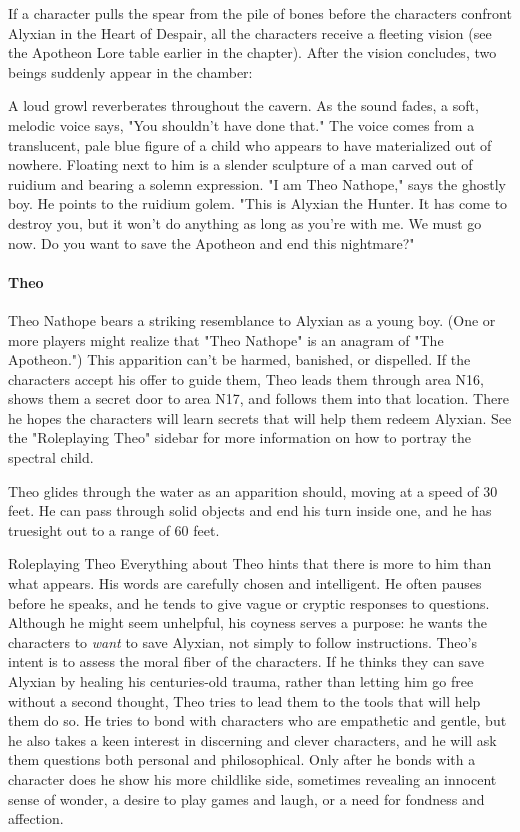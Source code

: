 \documentclass[a4paper, 11pt, bg=full, twocolumn, nooutline]{dndbook}
\begin{document}
If a character pulls the spear from the pile of bones before the characters confront Alyxian in the Heart of Despair, all the characters receive a fleeting vision (see the Apotheon Lore table earlier in the chapter). After the vision concludes, two beings suddenly appear in the chamber:

\begin{DndReadAloud}
A loud growl reverberates throughout the cavern. As the sound fades, a soft, melodic voice says, "You shouldn't have done that." The voice comes from a translucent, pale blue figure of a child who appears to have materialized out of nowhere. Floating next to him is a slender sculpture of a man carved out of ruidium and bearing a solemn expression.
"I am Theo Nathope," says the ghostly boy. He points to the ruidium golem. "This is Alyxian the Hunter. It has come to destroy you, but it won't do anything as long as you're with me. We must go now. Do you want to save the Apotheon and end this nightmare?"
\end{DndReadAloud}

\paragraph{Theo}

Theo Nathope bears a striking resemblance to Alyxian as a young boy. (One or more players might realize that "Theo Nathope" is an anagram of "The Apotheon.") This apparition can't be harmed, banished, or dispelled. If the characters accept his offer to guide them, Theo leads them through area N16, shows them a secret door to area N17, and follows them into that location. There he hopes the characters will learn secrets that will help them redeem Alyxian. See the "Roleplaying Theo" sidebar for more information on how to portray the spectral child.

Theo glides through the water as an apparition should, moving at a speed of 30 feet. He can pass through solid objects and end his turn inside one, and he has truesight out to a range of 60 feet.

\begin{DndSidebar}{Roleplaying Theo}
Everything about Theo hints that there is more to him than what appears. His words are carefully chosen and intelligent. He often pauses before he speaks, and he tends to give vague or cryptic responses to questions. Although he might seem unhelpful, his coyness serves a purpose: he wants the characters to \textit{want} to save Alyxian, not simply to follow instructions.
Theo's intent is to assess the moral fiber of the characters. If he thinks they can save Alyxian by healing his centuries-old trauma, rather than letting him go free without a second thought, Theo tries to lead them to the tools that will help them do so. He tries to bond with characters who are empathetic and gentle, but he also takes a keen interest in discerning and clever characters, and he will ask them questions both personal and philosophical. Only after he bonds with a character does he show his more childlike side, sometimes revealing an innocent sense of wonder, a desire to play games and laugh, or a need for fondness and affection.
\end{DndSidebar}
\end{document}
